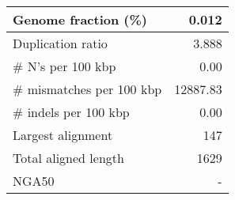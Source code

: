 \documentclass[12pt,a4paper]{article}
\begin{document}
\begin{table}[ht]
\begin{center}
\begin{tabular}{|l*{1}{|r}|}
Genome fraction (\%) & 0.012 \\ \hline
Duplication ratio & 3.888 \\ \hline
\# N's per 100 kbp & 0.00 \\ \hline
\# mismatches per 100 kbp & 12887.83 \\ \hline
\# indels per 100 kbp & 0.00 \\ \hline
Largest alignment & 147 \\ \hline
Total aligned length & 1629 \\ \hline
NGA50 & - \\ \hline
\end{tabular}
\end{center}
\end{table}
\end{document}

